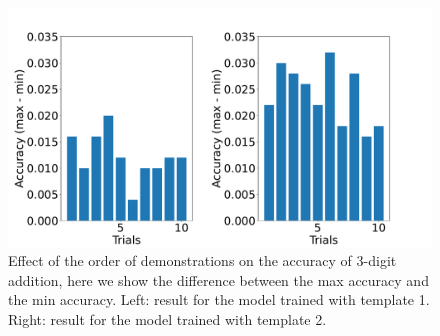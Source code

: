 \begin{figure}[th]
\begin{center}
\includegraphics[width = \columnwidth]{figs/cmp-PERM.pdf}
\caption{Effect of the order of demonstrations on the accuracy of 3-digit addition, here we show the difference between the max accuracy and the min accuracy. Left: result for the model trained with template 1. Right: result for the model trained with template 2.}
 \label{fig:perm}
\end{center}
\end{figure}

